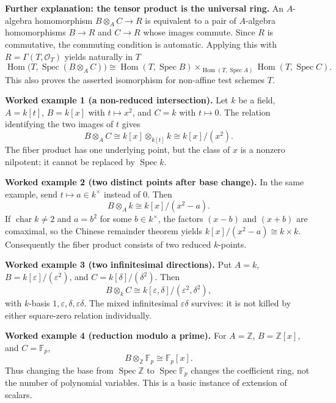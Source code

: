 \par\medskip
\noindent\textbf{Further explanation: the tensor product is the universal ring.}
An $A$-algebra homomorphism $B\otimes_A C\to R$ is equivalent to a
pair of $A$-algebra homomorphisms $B\to R$ and $C\to R$ whose images
commute.  Since $R$ is commutative, the commuting condition is automatic.
Applying this with $R=\Gamma(T,\mathcal O_T)$ yields naturally in $T$
\[
\operatorname{Hom}\!\bigl(T,\operatorname{Spec}(B\otimes_A C)\bigr)
\cong
\operatorname{Hom}(T,\operatorname{Spec} B)
\mathbin{\times}_{\operatorname{Hom}(T,\operatorname{Spec} A)}
\operatorname{Hom}(T,\operatorname{Spec} C).
\]
This also proves the asserted isomorphism for non-affine test schemes $T$.

\par\medskip
\noindent\textbf{Worked example 1 (a non-reduced intersection).}
Let $k$ be a field, $A=k[t]$, $B=k[x]$ with $t\mapsto x^2$,
and $C=k$ with $t\mapsto0$.  The relation identifying the two
images of $t$ gives
\[
B\otimes_A C
\cong k[x]\otimes_{k[t]} k
\cong k[x]/(x^2).
\]
The fiber product has one underlying point, but the class of $x$
is a nonzero nilpotent; it cannot be replaced by $\operatorname{Spec} k$.

\par\medskip
\noindent\textbf{Worked example 2 (two distinct points after base change).}
In the same example, send $t\mapsto a\in k^\times$ instead of $0$.
Then
\[
B\otimes_A k\cong k[x]/(x^2-a).
\]
If $\operatorname{char}k\ne2$ and $a=b^2$ for some $b\in k^\times$,
the factors $(x-b)$ and $(x+b)$ are comaximal, so the Chinese
remainder theorem yields $k[x]/(x^2-a)\cong k\times k$.
Consequently the fiber product consists of two reduced $k$-points.

\par\medskip
\noindent\textbf{Worked example 3 (two infinitesimal directions).}
Put $A=k$, $B=k[\varepsilon]/(\varepsilon^2)$, and
$C=k[\delta]/(\delta^2)$.  Then
\[
B\otimes_k C
\cong k[\varepsilon,\delta]/(\varepsilon^2,\delta^2),
\]
with $k$-basis $1,\varepsilon,\delta,\varepsilon\delta$.
The mixed infinitesimal $\varepsilon\delta$ survives: it is not
killed by either square-zero relation individually.

\par\medskip
\noindent\textbf{Worked example 4 (reduction modulo a prime).}
For $A=\mathbb Z$, $B=\mathbb Z[x]$, and $C=\mathbb F_p$,
\[
B\otimes_{\mathbb Z}\mathbb F_p
\cong\mathbb F_p[x].
\]
Thus changing the base from $\operatorname{Spec}\mathbb Z$ to
$\operatorname{Spec}\mathbb F_p$ changes the coefficient ring,
not the number of polynomial variables.  This is a basic instance
of extension of scalars.
